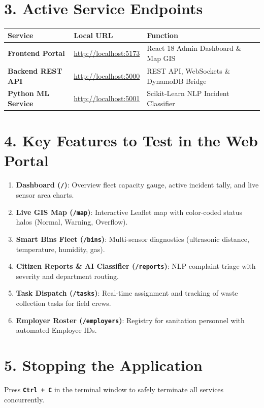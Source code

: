 \documentclass[11pt,a4paper]{article}
\begin{document}
\vspace{0.4em}

\section*{3. Active Service Endpoints}
\begin{center}
\begin{tabularx}{\textwidth}{l l X}
\toprule
\textbf{Service} & \textbf{Local URL} & \textbf{Function} \\
\midrule
\textbf{Frontend Portal} & \url{http://localhost:5173} & React 18 Admin Dashboard \& Map GIS \\
\textbf{Backend REST API} & \url{http://localhost:5000} & REST API, WebSockets \& DynamoDB Bridge \\
\textbf{Python ML Service} & \url{http://localhost:5001} & Scikit-Learn NLP Incident Classifier \\
\bottomrule
\end{tabularx}
\end{center}

\vspace{0.4em}

\section*{4. Key Features to Test in the Web Portal}
\begin{enumerate}
    \item \textbf{Dashboard (\texttt{/})}: Overview fleet capacity gauge, active incident tally, and live sensor area charts.
    \item \textbf{Live GIS Map (\texttt{/map})}: Interactive Leaflet map with color-coded status halos (Normal, Warning, Overflow).
    \item \textbf{Smart Bins Fleet (\texttt{/bins})}: Multi-sensor diagnostics (ultrasonic distance, temperature, humidity, gas).
    \item \textbf{Citizen Reports \& AI Classifier (\texttt{/reports})}: NLP complaint triage with severity and department routing.
    \item \textbf{Task Dispatch (\texttt{/tasks})}: Real-time assignment and tracking of waste collection tasks for field crews.
    \item \textbf{Employer Roster (\texttt{/employers})}: Registry for sanitation personnel with automated Employee IDs.
\end{enumerate}

\vspace{0.4em}

\section*{5. Stopping the Application}
Press \textbf{\texttt{Ctrl + C}} in the terminal window to safely terminate all services concurrently.
\end{document}
